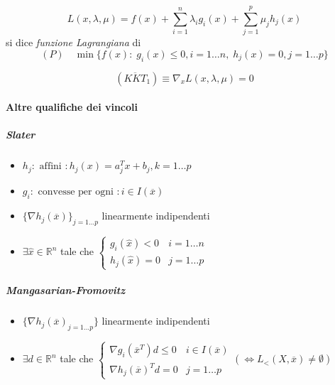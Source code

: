 \begin{defn}
  $$ L(x, \lambda, \mu) = f(x) + \displaystyle \sum_{i=1}^{n} \lambda_i
g_i(x) + \displaystyle \sum_{j=1}^{p} \mu_j h_j(x)$$
si dice \emph{funzione Lagrangiana} di
$$ (P) \quad  \min\{f(x): \; g_i(x)\leq 0, i=1\ldots n, \;
h_j(x)=0, j=1\ldots p \}
$$
\end{defn}

\begin{observation}
$$(\overline{KKT}_1) \equiv \nabla_x L(x, \lambda, \mu) = 0$$
\end{observation}
\paragraph{Altre qualifiche dei vincoli}

 \subparagraph{Slater}
 \begin{itemize}
 \item $h_j: \text{ affini }: h_j(x) = a_j^{T}x + b_j, k=1\ldots p $
 \item $g_i: \text{ convesse per ogni  }: i \in I(\overline{x})$
 \item $\{\nabla h_j(\overline{x})\}_{j=1\ldots p }$ linearmente indipendenti
 \item $\exists \hat{x} \in \mathbb{R}^{n}$ tale che
 $ 
\left\{
  \begin{array}{ll}
  g_i(\hat{x})< 0 & i=1\ldots n \\
  h_j(\hat{x}) = 0 & j=1\ldots p
   \end{array}
\right.
$
 \end{itemize}
 \subparagraph{Mangasarian-Fromovitz}
 \begin{itemize}
 \item $\{ \nabla h_j(\overline{x})_{j=1\ldots p} \}$ linearmente indipendenti
 \item $\exists d \in \mathbb{R}^{n}$ tale che
$  
\left\{
 \begin{array}{ll}
  \nabla g_i(\overline{x}^{T})d \leq 0 & i \in I(\overline{x})  \\
  \nabla h_j(\overline{x})^{T}d = 0 & j=1\ldots p  
 \end{array}
(\Longleftrightarrow L_{<}(X, \overline{x}) \neq \emptyset)
\right.
$
 \end{itemize}

